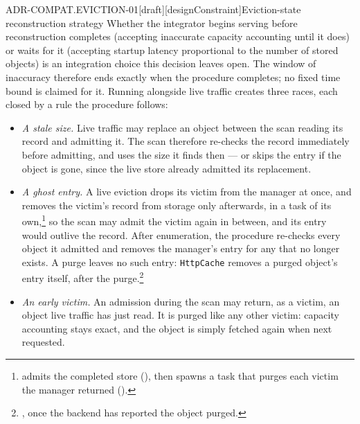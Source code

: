 \begin{requirement}{ADR-COMPAT.EVICTION-01}[draft][designConstraint]{Eviction-state reconstruction strategy}
  Whether the integrator begins serving before reconstruction completes
  (accepting inaccurate capacity accounting until it does) or waits for it
  (accepting startup latency proportional to the number of stored objects)
  is an integration choice this decision leaves open. The window of
  inaccuracy therefore ends exactly when the procedure completes; no fixed
  time bound is claimed for it. Running alongside live traffic creates three
  races, each closed by a rule the procedure follows:
  \begin{itemize}
    \item \emph{A stale size.} Live traffic may replace an object between
      the scan reading its record and admitting it. The scan therefore
      re-checks the record immediately before admitting, and uses the size
      it finds then --- or skips the entry if the object is gone, since the
      live store already admitted its replacement.
    \item \emph{A ghost entry.} A live eviction drops its victim from the
      manager at once, and removes the victim's record from storage only
      afterwards, in a task of its
      own,\footnote{
      admits the completed store (),
      then spawns a task that purges each victim the manager returned
      ().} so the scan may
      admit the victim again in between, and its entry would outlive the
      record. After enumeration, the procedure re-checks every object it
      admitted and removes the manager's entry for any that no longer
      exists. A purge leaves no such entry: \texttt{HttpCache} removes a
      purged object's entry itself, after the
      purge.\footnote{, once
      the backend has reported the object purged.}
    \item \emph{An early victim.} An admission during the scan may return,
      as a victim, an object live traffic has just read. It is purged like
      any other victim: capacity accounting stays exact, and the object is
      simply fetched again when next requested.
  \end{itemize}


\end{requirement}
